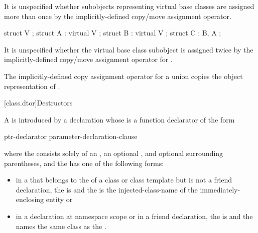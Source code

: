 %
It is unspecified whether subobjects representing virtual base classes
are assigned more than once by the implicitly-defined copy/move assignment
operator.
\begin{example}
\begin{codeblock}
struct V { };
struct A : virtual V { };
struct B : virtual V { };
struct C : B, A { };
\end{codeblock}

It is unspecified whether the virtual base class subobject
is assigned twice by the implicitly-defined copy/move assignment operator for
.
\end{example}

\pnum
The implicitly-defined copy assignment operator for a
union  copies the object representation of .%
%

[class.dtor]{Destructors}%
%
%

\pnum
A  is introduced by a declaration
whose  is a
function declarator of the form
\begin{ncbnf}
ptr-declarator \terminal{(} parameter-declaration-clause \terminal{)}  
\end{ncbnf}
where the  consists solely of an
, an optional ,
and optional surrounding parentheses, and the  has
one of the following forms:
\begin{itemize}
\item
in a  that belongs to the
 of a class or class template
but is not a friend
declaration, the  is
\tcode{\~} and the  is the
injected-class-name of the immediately-enclosing entity or

\item
in a declaration at namespace scope or in a friend declaration, the
 is 
\tcode{\~} and the  names the
same class as the .
\end{itemize}

